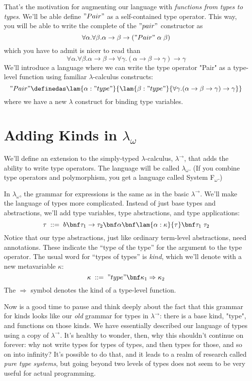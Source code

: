 That's the motivation for augmenting our language with \emph{functions from
types to types}.
We'll be able define $"Pair"$ as a self-contained type operator.
This way, you will be able to write the complete of the $"pair"$ constructor as
%
$$\forall \alpha. \forall \beta. \alpha \to \beta \to ("Pair" \; \alpha \;
\beta)$$
%
which you have to admit is nicer to read than
%
$$\forall \alpha. \forall \beta. \alpha \to \beta \to
\forall \gamma. (\alpha \to \beta \to \gamma) \to \gamma$$
%
We'll introduce a language where we can
write the type operator "Pair" as a type-level function
using familiar $\lambda$-calculus constructs:
%
$$"Pair" \definedas
\lam{\alpha : "type"}{\lam{\beta : "type"}{
\forall \gamma. (\alpha \to \beta \to \gamma) \to \gamma
}}$$
%
where we have a new $\lambda$ construct for binding type variables.

\section{Adding Kinds in $\lambda_\omega$}

We'll define an extension to the simply-typed $\lambda$-calculus,
$\lambda^\to$, that adds the ability to write type operators.
The language will be called $\lambda_\omega$.
(If you combine type operators and polymorphism, you get a language called
System F$_\omega$.)

In $\lambda_\omega$, the grammar for expressions is the same as in the basic
$\lambda^\to$.
We'll make the language of types more complicated.
Instead of just base types and abstractions, we'll add type variables, type
abstractions, and type applications:
%
\[
\tau \;::=\;
b \bnf
\tau_1 \to \tau_2 \bnf
\alpha \bnf
\lam{\alpha : \kappa}{\tau} \bnf
\tau_1 \; \tau_2
\]
%
Notice that our type abstractions, just like ordinary term-level abstractions,
need annotations.
These indicate the ``type of the type'' for the argument to the type operator.
The usual word for ``types of types'' is \emph{kind}, which we'll denote with
a new metavariable $\kappa$:
%
\[
\kappa \;::=\;
"type" \bnf
\kappa_1 \Rightarrow \kappa_2
\]
%
The $\Rightarrow$ symbol denotes the kind of a type-level function.

Now is a good time to pause and think deeply about the fact that this grammar
for kinds looks like our \emph{old} grammar for types in $\lambda^\to$: there
is a base kind, "type", and functions on those kinds.
We have essentially described our language of types using a copy of
$\lambda^\to$.
It's healthy to wonder, then, why this shouldn't continue on forever: why not
write types for types of types, and then types for those, and so on into
infinity?
It's possible to do that, and it leads to a realm of research called
\emph{pure type systems}, but going beyond two levels of types does not seem
to be very useful for actual programming.


